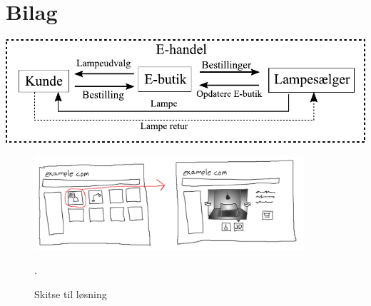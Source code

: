 \section{Bilag}

\includegraphics{graphics/e_handel_med_lampe.pdf}


\begin{figure}[H]
   \centering
   \includegraphics[width=10cm]{../graphics/skitse_til_loesning}
   \caption{Skitse til løsning}.
\end{figure}